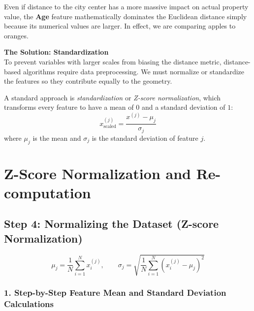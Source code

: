 \documentclass[12pt]{article}
\begin{document}
Even if distance to the city center has a more massive impact on
actual property value, the \textbf{Age} feature mathematically
dominates the Euclidean distance simply because its numerical
values are larger. In effect, we are comparing apples to oranges.

\vspace{0.3cm}
\noindent\textbf{The Solution: Standardization} \\
To prevent variables with larger scales from biasing the distance
metric, distance-based algorithms require data preprocessing.
We must normalize or standardize the features so they
contribute equally to the geometry.

A standard approach is \textit{standardization} or
\textit{Z-score normalization},
which transforms every feature to have a mean of $0$ and a
standard deviation of $1$:
\[
    x^{(j)}_{\text{scaled}} = \frac{x^{(j)} - \mu_j}{\sigma_j}
\]
where $\mu_j$ is the mean and $\sigma_j$ is the standard deviation of feature $j$.


\newpage

\section*{Z-Score Normalization and Re-computation}

\subsection*{Step 4: Normalizing the Dataset (Z-score Normalization)}
\[
    \mu_j = \frac{1}{N} \sum_{i=1}^{N} x_i^{(j)},
    \qquad
    \sigma_j = \sqrt{\frac{1}{N} \sum_{i=1}^{N} (x_i^{(j)} - \mu_j)^2}
\]

\subsubsection*{1. Step-by-Step Feature Mean and Standard Deviation Calculations}
\end{document}
